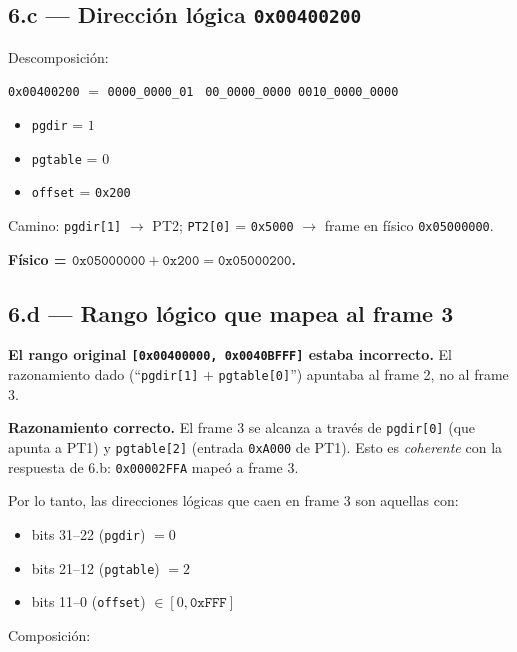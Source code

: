 \documentclass[11pt,a4paper]{article}
\begin{document}
\subsection*{6.c --- Dirección lógica \texttt{0x00400200}}

Descomposición:

\quad \texttt{0x00400200} $=$ \texttt{0000\_0000\_01}\ %
\texttt{00\_0000\_0000}\ \texttt{0010\_0000\_0000}

\begin{itemize}[leftmargin=*,nosep]
    \item \texttt{pgdir} = $1$
    \item \texttt{pgtable} = $0$
    \item \texttt{offset} = \texttt{0x200}
\end{itemize}

Camino: \texttt{pgdir[1]} $\to$ PT2; \texttt{PT2[0]} = \texttt{0x5000}
$\to$ frame en físico \texttt{0x05000000}.

\quad \textbf{Físico = $\texttt{0x05000000} + \texttt{0x200} =
\texttt{0x05000200}$.}

\subsection*{6.d --- Rango lógico que mapea al frame 3}

\begin{importante}
\textbf{El rango original \texttt{[0x00400000, 0x0040BFFF]} estaba
incorrecto.} El razonamiento dado (``\texttt{pgdir[1]} +
\texttt{pgtable[0]}'') apuntaba al frame 2, no al frame 3.
\end{importante}

\textbf{Razonamiento correcto.} El frame 3 se alcanza a través de
\texttt{pgdir[0]} (que apunta a PT1) y \texttt{pgtable[2]} (entrada
\texttt{0xA000} de PT1). Esto es \emph{coherente} con la respuesta de
6.b: \texttt{0x00002FFA} mapeó a frame 3.

Por lo tanto, las direcciones lógicas que caen en frame 3 son
aquellas con:

\begin{itemize}[leftmargin=*,nosep]
    \item bits 31--22 (\texttt{pgdir}) $= 0$
    \item bits 21--12 (\texttt{pgtable}) $= 2$
    \item bits 11--0 (\texttt{offset}) $\in [0, \texttt{0xFFF}]$
\end{itemize}

Composición:
\end{document}
